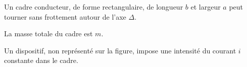 
\finEntrainement


\newpage



\hauteurLargeurCadreReponse		{8mm}{3cm}
\typeEntrainement				{} %
\initialisationEntrainement

\debutEntrainement



                                \initialisationPartieGauche %
%     
Un cadre conducteur, de forme rectangulaire, de longueur $b$ et largeur $a$ peut tourner sans frottement autour de l’axe $\Delta$. 

La masse totale du cadre est $m$. 

Un dispositif, non représenté sur la figure, impose une intensité du courant $i$ constante dans le cadre.


                                \initialisationPartieDroite %

